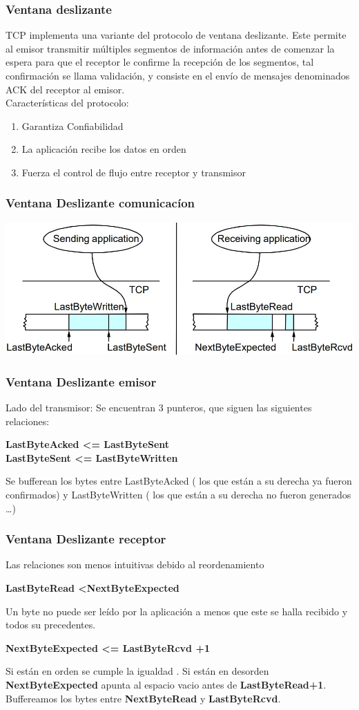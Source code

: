 \documentclass{beamer}
\begin{document}
\begin{frame}
	\frametitle{Ventana deslizante}
	TCP implementa una variante del protocolo de ventana deslizante. Este permite al emisor transmitir múltiples segmentos de información antes de comenzar la espera para que el receptor le confirme la recepción de los segmentos, tal confirmación se llama validación, y consiste en el envío de mensajes denominados ACK del receptor al emisor. \\
	Características del protocolo:\\
	\begin{enumerate}
		\item Garantiza Confiabilidad
		\item La aplicación recibe los datos en orden
		\item Fuerza el control de flujo entre receptor y transmisor
	\end{enumerate}
\end{frame}

\begin{frame}
	\frametitle{Ventana Deslizante comunicacíon}
	\includegraphics[width=\textwidth]{vdemisor}
\end{frame}
\begin{frame}
		\frametitle{Ventana Deslizante emisor}
	Lado del transmisor: Se encuentran 3 punteros, que siguen las siguientes relaciones:
	\begin{center}
\textbf{	LastByteAcked \textless= LastByteSent \\
	LastByteSent \textless= LastByteWritten}
	\end{center}
Se bufferean los bytes entre LastByteAcked ( los que están a su
derecha ya fueron confirmados) y LastByteWritten ( los que
están a su derecha no fueron generados …)
\end{frame}

\begin{frame}
		\frametitle{Ventana Deslizante receptor}
		Las relaciones son menos intuitivas debido al reordenamiento
		\begin{center}
			\textbf{LastByteRead \textless NextByteExpected}
		\end{center}
	Un byte no puede ser leído por la aplicación a menos que este se halla recibido y
	todos su
	precedentes.
	\begin{center}
	\textbf{	NextByteExpected \textless= LastByteRcvd +1}
	\end{center}
Si están en orden se cumple la igualdad . Si están en desorden
\textbf{NextByteExpected} apunta al espacio vacio antes de  \textbf{LastByteRead+1}.\\
Buffereamos los bytes entre \textbf{NextByteRead} y \textbf{LastByteRcvd}.
\end{frame}
 
\end{document}
